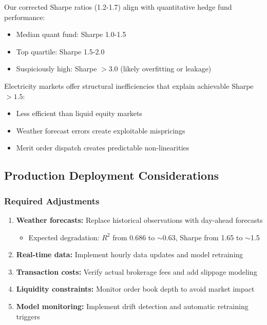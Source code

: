 \documentclass[11pt,a4paper]{article}
\begin{document}
Our corrected Sharpe ratios (1.2-1.7) align with quantitative hedge fund performance:
\begin{itemize}
    \item Median quant fund: Sharpe 1.0-1.5 \cite{agarwal2009}
    \item Top quartile: Sharpe 1.5-2.0
    \item Suspiciously high: Sharpe $> 3.0$ (likely overfitting or leakage)
\end{itemize}

Electricity markets offer structural inefficiencies that explain achievable Sharpe $> 1.5$:
\begin{itemize}
    \item Less efficient than liquid equity markets
    \item Weather forecast errors create exploitable mispricings
    \item Merit order dispatch creates predictable non-linearities
\end{itemize}

\subsection{Production Deployment Considerations}

\subsubsection{Required Adjustments}

\begin{enumerate}
    \item \textbf{Weather forecasts:} Replace historical observations with day-ahead forecasts
    \begin{itemize}
        \item Expected degradation: $R^2$ from 0.686 to $\sim$0.63, Sharpe from 1.65 to $\sim$1.5
    \end{itemize}

    \item \textbf{Real-time data:} Implement hourly data updates and model retraining

    \item \textbf{Transaction costs:} Verify actual brokerage fees and add slippage modeling

    \item \textbf{Liquidity constraints:} Monitor order book depth to avoid market impact

    \item \textbf{Model monitoring:} Implement drift detection and automatic retraining triggers
\end{enumerate}
\end{document}
